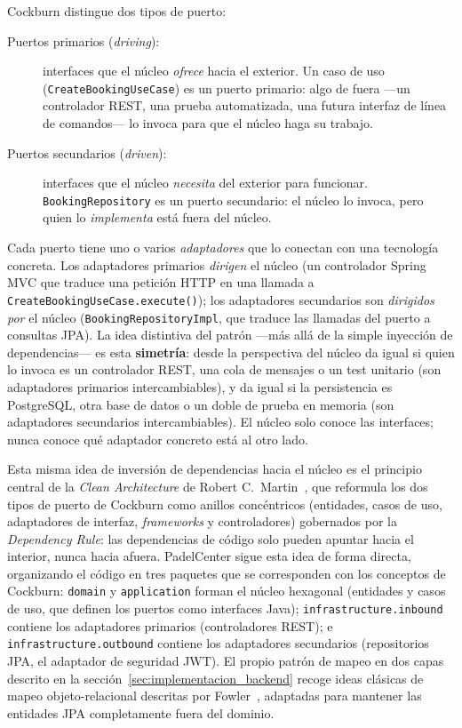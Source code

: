Cockburn distingue dos tipos de puerto:
\begin{description}
  \item[Puertos primarios (\textit{driving}):] interfaces que el núcleo
    \emph{ofrece} hacia el exterior. Un caso de uso (\texttt{CreateBookingUseCase})
    es un puerto primario: algo de fuera —un controlador REST, una prueba
    automatizada, una futura interfaz de línea de comandos— lo invoca para que
    el núcleo haga su trabajo.
  \item[Puertos secundarios (\textit{driven}):] interfaces que el núcleo
    \emph{necesita} del exterior para funcionar. \texttt{BookingRepository} es
    un puerto secundario: el núcleo lo invoca, pero quien lo \emph{implementa}
    está fuera del núcleo.
\end{description}

Cada puerto tiene uno o varios \textit{adaptadores} que lo conectan con una
tecnología concreta. Los adaptadores primarios \emph{dirigen} el núcleo
(un controlador Spring MVC que traduce una petición HTTP en una llamada a
\texttt{CreateBookingUseCase.execute()}); los adaptadores secundarios son
\emph{dirigidos por} el núcleo (\texttt{BookingRepositoryImpl}, que traduce las
llamadas del puerto a consultas JPA). La idea distintiva del patrón —más allá
de la simple inyección de dependencias— es esta \textbf{simetría}: desde la
perspectiva del núcleo da igual si quien lo invoca es un controlador REST, una
cola de mensajes o un test unitario (son adaptadores primarios intercambiables),
y da igual si la persistencia es PostgreSQL, otra base de datos o un doble de
prueba en memoria (son adaptadores secundarios intercambiables). El núcleo
solo conoce las interfaces; nunca conoce qué adaptador concreto está al otro
lado.

Esta misma idea de inversión de dependencias hacia el núcleo es el principio
central de la \textit{Clean Architecture} de Robert C.~Martin~\cite{martin2017cleanarchitecture},
que reformula los dos tipos de puerto de Cockburn como anillos concéntricos
(entidades, casos de uso, adaptadores de interfaz, \textit{frameworks} y
controladores) gobernados por la \textit{Dependency Rule}: las dependencias de
código solo pueden apuntar hacia el interior, nunca hacia afuera. PadelCenter
sigue esta idea de forma directa, organizando el código en tres paquetes que se
corresponden con los conceptos de Cockburn: \texttt{domain} y
\texttt{application} forman el núcleo hexagonal (entidades y casos de uso, que
definen los puertos como interfaces Java); \texttt{infrastructure.inbound}
contiene los adaptadores primarios (controladores REST); e
\texttt{infrastructure.outbound} contiene los adaptadores secundarios
(repositorios JPA, el adaptador de seguridad JWT). El propio patrón de mapeo en
dos capas descrito en la sección~\ref{sec:implementacion_backend} recoge ideas
clásicas de mapeo objeto-relacional descritas por Fowler~\cite{fowler2002peaa},
adaptadas para mantener las entidades JPA completamente fuera del dominio.

